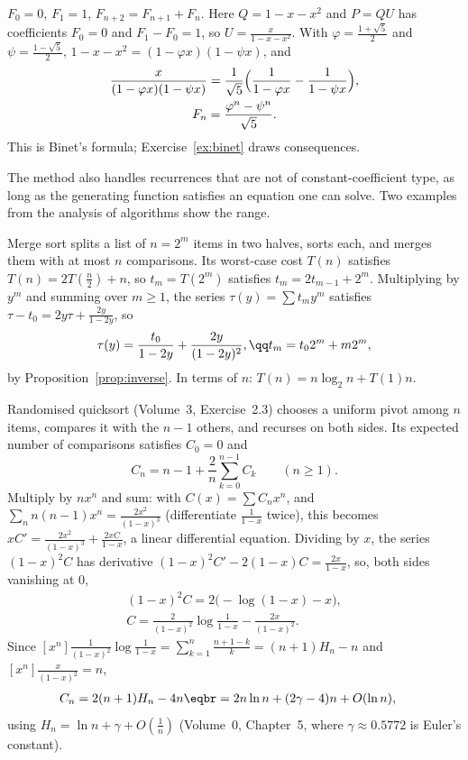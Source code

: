 \begin{example}[Fibonacci]\label{ex:fibonacci}
$F_0=0$, $F_1=1$, $F_{n+2}=F_{n+1}+F_n$. Here $Q=1-x-x^2$ and $P=QU$ has coefficients $F_0=0$ and $F_1-F_0=1$, so
$U=\frac x{1-x-x^2}$. With $\varphi=\frac{1+\sqrt5}2$ and $\psi=\frac{1-\sqrt5}2$, $1-x-x^2=(1-\varphi x)(1-\psi x)$, and
\[
\begin{gathered}\frac x{(1-\varphi x)(1-\psi x)}=\frac1{\sqrt5}\Bigl(\frac1{1-\varphi x}-\frac1{1-\psi x}\Bigr),\\F_n=\frac{\varphi^n-\psi^n}{\sqrt5}.\end{gathered}
\]
This is Binet's formula; Exercise~\ref{ex:binet} draws consequences.
\end{example}

The method also handles recurrences that are not of constant-coefficient type, as long as the generating
function satisfies an equation one can solve. Two examples from the analysis of algorithms show the range.

\begin{example}\label{ex:mergesort}
Merge sort splits a list of $n=2^m$ items in two halves, sorts each, and merges them with at most $n$ comparisons. Its
worst-case cost $T(n)$ satisfies $T(n)=2T(\frac n2)+n$, so $t_m=T(2^m)$ satisfies $t_m=2t_{m-1}+2^m$. Multiplying by
$y^m$ and summing over $m\ge1$, the series $\tau(y)=\sum t_my^m$ satisfies $\tau-t_0=2y\tau+\frac{2y}{1-2y}$, so
\[
\tau(y)=\frac{t_0}{1-2y}+\frac{2y}{(1-2y)^2},\qq t_m=t_02^m+m2^m,
\]
by Proposition~\ref{prop:inverse}. In terms of $n$: $T(n)=n\log_2n+T(1)n$.
\end{example}

\begin{example}[quicksort]\label{ex:quicksortexact}
Randomised quicksort (Volume~3, Exercise~2.3) chooses a uniform pivot among $n$ items, compares it with the $n-1$
others, and recurses on both sides. Its expected number of comparisons satisfies $C_0=0$ and
\[
C_n=n-1+\frac2n\sum_{k=0}^{n-1}C_k\qquad(n\ge1).
\]
Multiply by $nx^n$ and sum: with $C(x)=\sum C_nx^n$, and $\sum_nn(n-1)x^n=\frac{2x^2}{(1-x)^3}$ (differentiate
$\frac1{1-x}$ twice), this becomes $xC'=\frac{2x^2}{(1-x)^3}+\frac{2xC}{1-x}$, a linear differential equation. Dividing
by $x$, the series $(1-x)^2C$ has derivative $(1-x)^2C'-2(1-x)C=\frac{2x}{1-x}$, so, both sides vanishing at $0$,
\[
\begin{gathered}(1-x)^2C=2\bigl(-\log(1-x)-x\bigr),\\C=\frac2{(1-x)^2}\log\frac1{1-x}-\frac{2x}{(1-x)^2}.\end{gathered}
\]
Since $[x^n]\frac1{(1-x)^2}\log\frac1{1-x}=\sum_{k=1}^n\frac{n+1-k}k=(n+1)H_n-n$ and $[x^n]\frac x{(1-x)^2}=n$,
\[
\begin{aligned}C_n&=2(n+1)H_n-4n\eqbr=2n\ln n+(2\gamma-4)n+O(\ln n),\end{aligned}
\]
using $H_n=\ln n+\gamma+O(\frac1n)$ (Volume~0, Chapter~5, where $\gamma\approx0.5772$ is Euler's constant).
\end{example}

